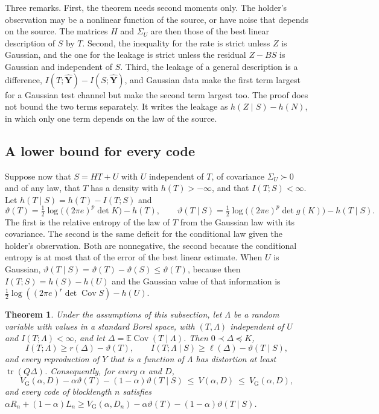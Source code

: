 \documentclass[11pt,onecolumn]{IEEEtran}
\newtheorem{theorem}{Theorem}
\newcommand{\E}{\mathbb{E}}
\newcommand{\tr}{\operatorname{tr}}
\newcommand{\Cov}{\operatorname{Cov}}
\newcommand{\hY}{\hat{\mathbf Y}}
\newcommand{\VG}{V_{\mathrm G}}
\begin{document}
Three remarks. First, the theorem needs second moments only. The
holder's observation may be a nonlinear function of the source, or
have noise that depends on the source. The matrices $H$ and $\Sigma_U$
are then those of the best linear description of $S$ by $T$. Second,
the inequality for the rate is strict unless $Z$ is Gaussian, and the
one for the leakage is strict unless the residual $Z-BS$ is Gaussian
and independent of $S$. Third, the leakage of a general description
is a difference, $I(T;\hY)-I(S;\hY)$, and Gaussian data make the first
term largest for a Gaussian test channel but make the second term
largest too. The proof does not bound the two terms separately. It
writes the leakage as $h(Z\mid S)-h(N)$, in which only one term depends
on the law of the source.

\subsection{A lower bound for every code}

Suppose now that $S=HT+U$ with $U$ independent of $T$, of covariance
$\Sigma_U\succ0$ and of any law, that $T$ has a density with
$h(T)>-\infty$, and that $I(T;S)<\infty$. Let
$h(T\mid S)=h(T)-I(T;S)$ and
\begin{equation}
\vartheta(T)=\tfrac12\log\bigl((2\pi e)^p\det K\bigr)-h(T),\qquad
\vartheta(T\mid S)=\tfrac12\log\bigl((2\pi e)^p\det g(K)\bigr)-h(T\mid S).
\label{eq:deficits}
\end{equation}
The first is the relative entropy of the law of $T$ from the Gaussian
law with its covariance. The second is the same deficit for the
conditional law given the holder's observation. Both are nonnegative,
the second because the conditional entropy is at most that of the
error of the best linear estimate. When $U$ is Gaussian,
$\vartheta(T\mid S)=\vartheta(T)-\vartheta(S)\le\vartheta(T)$, because
then $I(T;S)=h(S)-h(U)$ and the Gaussian value of that information is
$\tfrac12\log((2\pi e)^r\det\Cov S)-h(U)$.

\begin{theorem}\label{thm:outer}
Under the assumptions of this subsection, let $\Lambda$ be a random
variable with values in a standard Borel space, with $(T,\Lambda)$
independent of $U$ and $I(T;\Lambda)<\infty$, and let
$\Delta=\E\Cov(T\mid\Lambda)$. Then $0\prec\Delta\preceq K$,
\begin{equation}
I(T;\Lambda)\ge r(\Delta)-\vartheta(T),\qquad
I(T;\Lambda\mid S)\ge\ell(\Delta)-\vartheta(T\mid S),
\label{eq:outer}
\end{equation}
and every reproduction of $Y$ that is a function of $\Lambda$ has
distortion at least $\tr(Q\Delta)$. Consequently, for every $\alpha$
and $D$,
\[
\VG(\alpha,D)-\alpha\vartheta(T)-(1-\alpha)\vartheta(T\mid S)\ \le\ V(\alpha,D)\ \le\ \VG(\alpha,D),
\]
and every code of blocklength $n$ satisfies
$\alpha R_n+(1-\alpha)L_n\ge\VG(\alpha,D_n)-\alpha\vartheta(T)-(1-\alpha)\vartheta(T\mid S)$.
\end{theorem}
\end{document}
